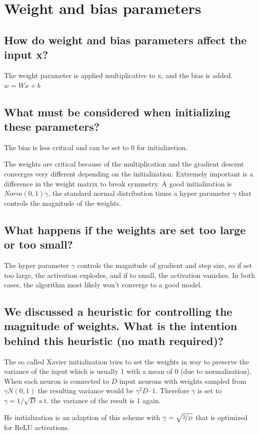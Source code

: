 \section{Weight and bias parameters}
\subsection{How do weight and bias parameters affect the input x?}
The weight parameter is applied multiplicative to x, and the bias is added. $w = Wx+b$
\subsection{What must be considered when initializing these parameters?}
The bias is less critical and can be set to $0$ for initializetion.

The weights are critical because of the multiplication and the gradient descent converges very different depending on the initialization. Extremely important is a difference in the weight matrix to break symmetry. A good  initialization is $Norm(0,1)\gamma$, the standard normal distribution times a hyper parameter $\gamma$ that controls the magnitude of the weights.
\subsection{What happens if the weights are set too large or too small?}
The hyper parameter $\gamma$ controls the magnitude of gradient and step size, so if set too large, the activation explodes, and if to small, the activation vanishes. In both cases, the algorithm most likely won't converge to a good model. 
\subsection{We discussed a heuristic for controlling the magnitude of weights. What is the intention behind this heuristic (no math required)?}
The so called Xavier initialization tries to set the weights in way to preserve the variance of the input which is usually $1$ with a mean of $0$ (due to normalization). When each neuron is connected to $D$ input neurons with weights sampled from $\gamma N(0,1)$ the resulting variance would be $\gamma^2 D\cdot 1$. Therefore $\gamma$ is set to $\gamma= 1/\sqrt{D}$ s.t. the variance of the result is $1$ again. 

He initialization is an adaption of this scheme with $\gamma = \sqrt{\nicefrac 2 D}$ that is optimized for ReLU activations.
%

